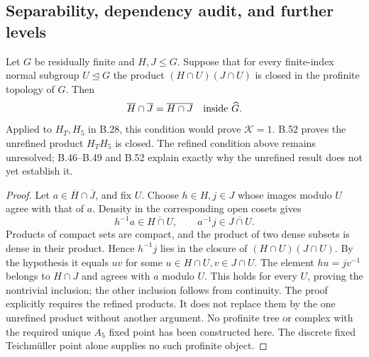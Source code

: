 \subsection*{Separability, dependency audit, and further levels}

Let $G$ be residually finite and $H,J\leq G$. Suppose that for
every finite-index normal subgroup $U\trianglelefteq G$ the product
$(H\cap U)(J\cap U)$ is closed in the profinite topology of $G$.
Then
\[
             \overline H\cap\overline J=\overline{H\cap J}
                         \quad\hbox{inside }\widehat G.
\]
Applied to $H_T,H_5$ in B.28, this condition would prove
$\mathcal K=1$. B.52 proves the unrefined product $H_TH_5$ is closed.
The refined condition above remains unresolved; B.46--B.49
and B.52 explain exactly why the unrefined result does not
yet establish it.
\begin{proof}
Let $a\in\overline H\cap\overline J$, and fix $U$.
Choose $h\in H,j\in J$ whose images modulo $U$ agree with that
of $a$. Density in the corresponding open cosets gives
\[
 h^{-1}a\in\overline{H\cap U},\qquad
 a^{-1}j\in\overline{J\cap U}.
\]
Products of compact sets are compact, and the product of two
dense subsets is dense in their product. Hence
$h^{-1}j$ lies in the closure of $(H\cap U)(J\cap U)$.
By the hypothesis it equals $uv$ for some
$u\in H\cap U,v\in J\cap U$.
The element $hu=jv^{-1}$ belongs to $H\cap J$ and agrees
with $a$ modulo $U$. This holds for every $U$, proving the
nontrivial inclusion; the other inclusion follows from continuity.
The proof explicitly requires the refined products. It does not
replace them by the one unrefined product without another argument.
No profinite tree or complex with the required unique $A_5$ fixed
point has been constructed here. The discrete fixed Teichm\"uller
point alone supplies no such profinite object.
\end{proof}

